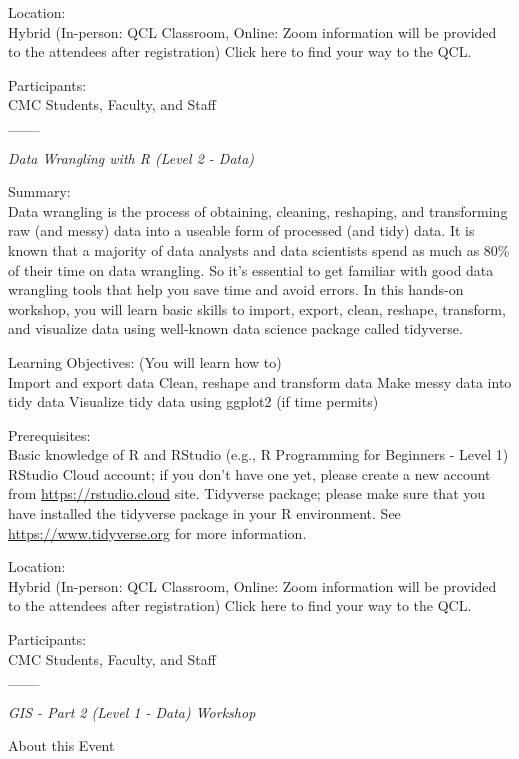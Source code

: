 \documentclass[
]{book}
\begin{document}
Location:\\
Hybrid (In-person: QCL Classroom, Online: Zoom information will be provided to the attendees after registration)
Click here to find your way to the QCL.

Participants:\\
CMC Students, Faculty, and Staff\\
\_\_\_

\emph{Data Wrangling with R (Level 2 - Data)}

Summary:\\
Data wrangling is the process of obtaining, cleaning, reshaping, and transforming raw (and messy) data into a useable form of processed (and tidy) data. It is known that a majority of data analysts and data scientists spend as much as 80\% of their time on data wrangling. So it's essential to get familiar with good data wrangling tools that help you save time and avoid errors. In this hands-on workshop, you will learn basic skills to import, export, clean, reshape, transform, and visualize data using well-known data science package called tidyverse.

Learning Objectives: (You will learn how to)\\
Import and export data
Clean, reshape and transform data
Make messy data into tidy data
Visualize tidy data using ggplot2 (if time permits)

Prerequisites:\\
Basic knowledge of R and RStudio (e.g., R Programming for Beginners - Level 1)
RStudio Cloud account; if you don't have one yet, please create a new account from \url{https://rstudio.cloud} site.
Tidyverse package; please make sure that you have installed the tidyverse package in your R environment. See \url{https://www.tidyverse.org} for more information.

Location:\\
Hybrid (In-person: QCL Classroom, Online: Zoom information will be provided to the attendees after registration)
Click here to find your way to the QCL.

Participants:\\
CMC Students, Faculty, and Staff\\
\_\_\_

\emph{GIS - Part 2 (Level 1 - Data) Workshop}

About this Event
\end{document}
